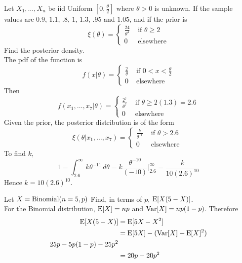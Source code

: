 \documentclass[12pt]{article}
\begin{document}
\begin{question} Let $X_1,\dots, X_n$ be iid Uniform $[0, \frac{\theta}{2}]$ where $\theta > 0$ is unknown. If the sample values are $0.9$, $1.1$, $.8$, $1$, $1.3$, $.95$ and $1.05$, and if the prior is $$\xi(\theta) = \begin{cases} \frac{24}{\theta^4} &\text{ if } \theta \geq 2 \\ 0 &\text{ elsewhere} \end{cases} $$ Find the posterior density. \\
The pdf of the function is $$ f(x|\theta) = \begin{cases} \frac{2}{\theta} &\text{ if } 0 < x < \frac{\theta}{2} \\ 0 &\text{ elsewhere } \end{cases} $$ 
Then $$ f(x_1,\dots,x_7 | \theta) = \begin{cases} \frac{2^7}{\theta^7} &\text{ if } \theta \geq 2(1.3) = 2.6 \\ 0 &\text{ elsewhere} \end{cases} $$ 
Given the prior, the posterior distribution is of the form $$ \xi(\theta | x_1,\dots,x_7) = \begin{cases} \frac{k}{\theta^{11}} &\text{ if } \theta > 2.6 \\ 0 &\text{ elsewhere } \end{cases} $$ 
To find $k$, $$ 1 = \int_{2.6}^\infty k\theta^{-11} \, d\theta = k\frac{\theta^{-10}}{(-10)}\Big|_{2.6}^\infty = \frac{k}{10(2.6)^{10}} $$ Hence $k = 10(2.6)^{10}$. 
\end{question} 

\begin{question} Let $X = \text{Binomial}( n=5,p )$ Find, in terms of $p$, $\mathrm{E}[ X(5-X) ]$. \\
For the Binomial distribution, $\mathrm{E}[ X ] = np$ and $\mathrm{Var}[ X ] = np(1-p)$. Therefore 
$$ \begin{aligned} \mathrm{E}[ X(5-X) ] &= \mathrm{E}[ 5X - X^2 ] \\ &= \mathrm{E}[ 5X ] - (\mathrm{Var}[ X ] + \mathrm{E}[ X ]^2) \\ 25p - 5p(1-p) - 25p^2 \\ &= 20p - 20p^2 \end{aligned} $$ 
\end{question} 
\end{document}

